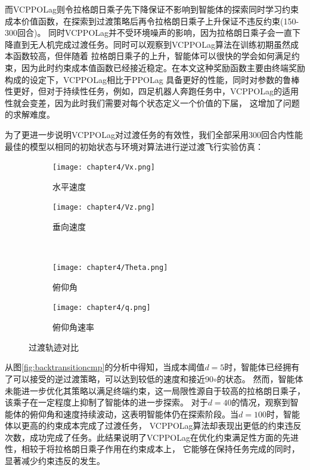而VCPPOLag则令拉格朗日乘子先下降保证不影响到智能体的探索同时学习约束成本价值函数，在探索到过渡策略后再令拉格朗日乘子上升保证不违反约束(150-300回合)。
同时VCPPOLag并不受环境噪声的影响，因为拉格朗日乘子会一直下降直到无人机完成过渡任务。同时可以观察到VCPPOLag算法在训练初期虽然成本函数较高，但伴随着
拉格朗日乘子的上升，智能体可以很快的学会如何满足约束，因为此时约束成本值函数已经接近稳定。在本文这种奖励函数主要由终端奖励构成的设定下，VCPPOLag相比于PPOLag
具备更好的性能，同时对参数的鲁棒性更好，但对于持续性任务，例如，四足机器人奔跑任务中，VCPPOLag的适用性就会变差，因为此时我们需要对每个状态定义一个价值的下届，
这增加了问题的求解难度。

为了更进一步说明VCPPOLag对过渡任务的有效性，我们全部采用300回合内性能最佳的模型以相同的初始状态与环境对算法进行逆过渡飞行实验仿真：
\begin{figure}[H]
    \centering
    \begin{subfigure}{.45\textwidth}
        \centering
        \texttt{[image: chapter4/Vx.png]}
        \caption{水平速度}
        \label{fig:vxcmp}
    \end{subfigure}%
    \hfill %
    \begin{subfigure}{.45\textwidth}
        \centering
        \texttt{[image: chapter4/Vz.png]}
        \caption{垂向速度}
        \label{fig:vzcmp}
    \end{subfigure}
    \\
    \begin{subfigure}{.45\textwidth}
        \centering
        \texttt{[image: chapter4/Theta.png]}
        \caption{俯仰角}
        \label{fig:vxcmp}
    \end{subfigure}%
    \hfill %
    \begin{subfigure}{.45\textwidth}
        \centering
        \texttt{[image: chapter4/q.png]}
        \caption{俯仰角速率}
        \label{fig:vzcmp}
    \end{subfigure}
    \caption{过渡轨迹对比}
    \label{fig:backtransitioncmp}
\end{figure}

从图\autoref{fig:backtransitioncmp}的分析中得知，当成本阈值$d=5$时，智能体已经拥有了可以接受的逆过渡策略，可以达到较低的速度和接近90$\circ$的状态。
然而，智能体未能进一步优化其策略以满足终端约束，这一局限性源自于较高的拉格朗日乘子，该乘子在一定程度上抑制了智能体的进一步探索。
对于$d=40$的情况，观察到智能体的俯仰角和速度持续波动，这表明智能体仍在探索阶段。当$d=100$时，智能体以更高的约束成本完成了过渡任务，
VCPPOLag算法却表现出更低的约束违反次数，成功完成了任务。此结果说明了VCPPOLag在优化约束满足性方面的先进性，相较于将拉格朗日乘子作用在约束成本上，
它能够在保持任务完成的同时，显著减少约束违反的发生。

